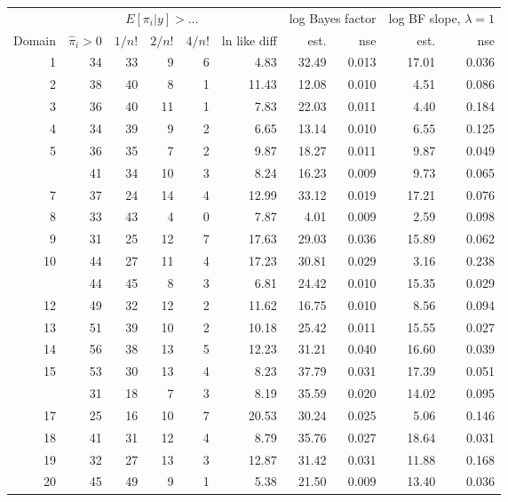 
\begin{tabular}[t]{rrrrrrrrrr}
\toprule
\multicolumn{1}{c}{ } & \multicolumn{1}{c}{ } & \multicolumn{3}{c}{$E[\pi_i|y]>\ldots$} & \multicolumn{1}{c}{ } & \multicolumn{2}{c}{log Bayes factor} & \multicolumn{2}{c}{log BF slope, $\lambda = 1$} \\
\cmidrule(l{3pt}r{3pt}){3-5} \cmidrule(l{3pt}r{3pt}){7-8} \cmidrule(l{3pt}r{3pt}){9-10}
Domain & $\hat{\pi}_i>0$ & $1/n!$ & $2/n!$ & $4/n!$ & ln like diff & est. & nse & est. & nse\\
\midrule
1 & 34 & 33 & 9 & 6 & 4.83 & 32.49 & 0.013 & 17.01 & 0.036\\
2 & 38 & 40 & 8 & 1 & 11.43 & 12.08 & 0.010 & 4.51 & 0.086\\
3 & 36 & 40 & 11 & 1 & 7.83 & 22.03 & 0.011 & 4.40 & 0.184\\
4 & 34 & 39 & 9 & 2 & 6.65 & 13.14 & 0.010 & 6.55 & 0.125\\
5 & 36 & 35 & 7 & 2 & 9.87 & 18.27 & 0.011 & 9.87 & 0.049\\
\addlinespace
6 & 41 & 34 & 10 & 3 & 8.24 & 16.23 & 0.009 & 9.73 & 0.065\\
7 & 37 & 24 & 14 & 4 & 12.99 & 33.12 & 0.019 & 17.21 & 0.076\\
8 & 33 & 43 & 4 & 0 & 7.87 & 4.01 & 0.009 & 2.59 & 0.098\\
9 & 31 & 25 & 12 & 7 & 17.63 & 29.03 & 0.036 & 15.89 & 0.062\\
10 & 44 & 27 & 11 & 4 & 17.23 & 30.81 & 0.029 & 3.16 & 0.238\\
\addlinespace
11 & 44 & 45 & 8 & 3 & 6.81 & 24.42 & 0.010 & 15.35 & 0.029\\
12 & 49 & 32 & 12 & 2 & 11.62 & 16.75 & 0.010 & 8.56 & 0.094\\
13 & 51 & 39 & 10 & 2 & 10.18 & 25.42 & 0.011 & 15.55 & 0.027\\
14 & 56 & 38 & 13 & 5 & 12.23 & 31.21 & 0.040 & 16.60 & 0.039\\
15 & 53 & 30 & 13 & 4 & 8.23 & 37.79 & 0.031 & 17.39 & 0.051\\
\addlinespace
16 & 31 & 18 & 7 & 3 & 8.19 & 35.59 & 0.020 & 14.02 & 0.095\\
17 & 25 & 16 & 10 & 7 & 20.53 & 30.24 & 0.025 & 5.06 & 0.146\\
18 & 41 & 31 & 12 & 4 & 8.79 & 35.76 & 0.027 & 18.64 & 0.031\\
19 & 32 & 27 & 13 & 3 & 12.87 & 31.42 & 0.031 & 11.88 & 0.168\\
20 & 45 & 49 & 9 & 1 & 5.38 & 21.50 & 0.009 & 13.40 & 0.036\\

\end{tabular}
